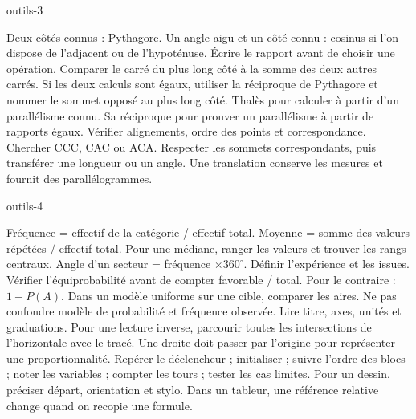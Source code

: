 \begin{blocEdition}{outils-3}

Deux côtés connus : Pythagore. Un angle aigu et un côté connu : cosinus si l’on dispose de l’adjacent ou de l’hypoténuse. Écrire le rapport avant de choisir une opération.
Comparer le carré du plus long côté à la somme des deux autres carrés. Si les deux calculs sont égaux, utiliser la réciproque de Pythagore et nommer le sommet opposé au plus long côté.
Thalès pour calculer à partir d’un parallélisme connu. Sa réciproque pour prouver un parallélisme à partir de rapports égaux. Vérifier alignements, ordre des points et correspondance.
Chercher CCC, CAC ou ACA. Respecter les sommets correspondants, puis transférer une longueur ou un angle. Une translation conserve les mesures et fournit des parallélogrammes.
\end{blocEdition}
\begin{blocEdition}{outils-4}

Fréquence = effectif de la catégorie / effectif total. Moyenne = somme des valeurs répétées / effectif total. Pour une médiane, ranger les valeurs et trouver les rangs centraux. Angle d’un secteur = fréquence $\times360^\circ$.
Définir l’expérience et les issues. Vérifier l’équiprobabilité avant de compter favorable / total. Pour le contraire : $1-P(A)$. Dans un modèle uniforme sur une cible, comparer les aires. Ne pas confondre modèle de probabilité et fréquence observée.
Lire titre, axes, unités et graduations. Pour une lecture inverse, parcourir toutes les intersections de l’horizontale avec le tracé. Une droite doit passer par l’origine pour représenter une proportionnalité.
Repérer le déclencheur ; initialiser ; suivre l’ordre des blocs ; noter les variables ; compter les tours ; tester les cas limites. Pour un dessin, préciser départ, orientation et stylo. Dans un tableur, une référence relative change quand on recopie une formule.
\end{blocEdition}
